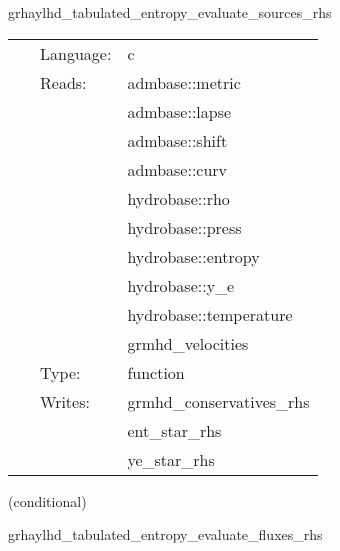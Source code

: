 \documentclass{article}
\begin{document}
\hspace{5mm} grhaylhd\_tabulated\_entropy\_evaluate\_sources\_rhs 

\hspace{5mm}{\it entropy+tabulated version of grhaylhd\_evaluate\_sources\_rhs } 


\hspace{5mm}

 \begin{tabular*}{160mm}{cll} 
~ & Language:  & c \\ 
~ & Reads:  & admbase::metric \\ 
~& ~ &admbase::lapse\\ 
~& ~ &admbase::shift\\ 
~& ~ &admbase::curv\\ 
~& ~ &hydrobase::rho\\ 
~& ~ &hydrobase::press\\ 
~& ~ &hydrobase::entropy\\ 
~& ~ &hydrobase::y\_e\\ 
~& ~ &hydrobase::temperature\\ 
~& ~ &grmhd\_velocities\\ 
~ & Type:  & function \\ 
~ & Writes:  & grmhd\_conservatives\_rhs \\ 
~& ~ &ent\_star\_rhs\\ 
~& ~ &ye\_star\_rhs\\ 
\end{tabular*} 


\vspace{5mm}

   (conditional) 

\hspace{5mm} grhaylhd\_tabulated\_entropy\_evaluate\_fluxes\_rhs 

\hspace{5mm}{\it entropy+tabulated version of grhaylhd\_evaluate\_fluxes\_rhs } 


\hspace{5mm}
\end{document}
